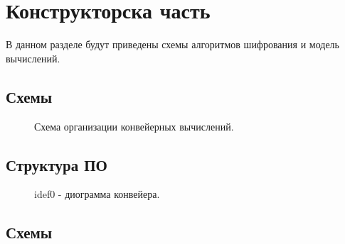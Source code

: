 \documentclass[12pt,a4paper]{report}
\begin{document}
\newpage
\chapter{Конструкторска часть}

В данном разделе будут приведены схемы алгоритмов шифрования и модель вычислений.

\section{Схемы}

\begin{figure}[ht]
	\caption{Схема организации конвейерных вычислений.}
\end{figure}

\section{Структура ПО}

\begin{figure}[ht]
	\caption{idef0 - диограмма конвейера.}
\end{figure}

\section{Схемы}
\end{document}
